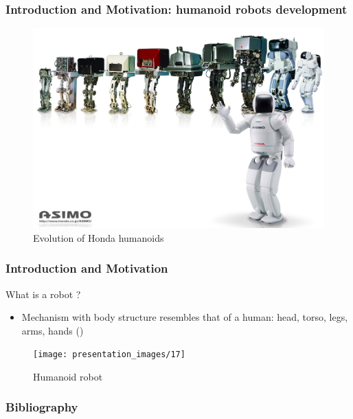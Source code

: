 \documentclass{beamer}
\begin{document}
	\begin{frame}
		\frametitle{Introduction and Motivation: humanoid robots development}
		\begin{figure}[h!]
			\includegraphics[width=0.8\linewidth]{presentation_images/6}
			\caption{Evolution of Honda humanoids}
		\end{figure}
	\end{frame}
	

	\begin{frame}
		\frametitle{Introduction and Motivation}
		\begin{block}{What is a robot ?}
			\begin{itemize}
				\item
				Mechanism with body structure resembles that of a human: head, torso, legs, arms, hands (\cite{hirai1998development})
			\end{itemize}
		\end{block}
		\begin{figure}[h!]
			\begin{minipage}[H]{\linewidth}
				\centering
				\texttt{[image: presentation\_images/17]}
				\caption{Humanoid robot}
			\end{minipage}
		\end{figure}
	\end{frame}
	

	\begin{frame}[allowframebreaks]
		\frametitle{Bibliography}    
		
		
	\end{frame}
\end{document}
